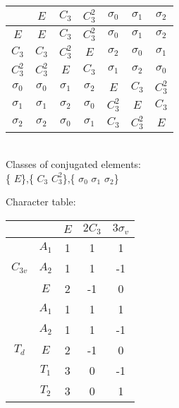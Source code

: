 \documentclass[12pt]{report}
\begin{document}
 
 
\newcommand{\rr}{\boldsymbol{r}} 
\newcommand{\kk}{\boldsymbol{k}} 
\newcommand{\RR}{\boldsymbol{R}} 
\newcommand{\fsp}{\mbox{ }} 
\renewcommand{\le}{\leqslant} 
\renewcommand{\ge}{\geqslant} 
\newcommand{\ds}{\displaystyle} 
\newcommand{\eps}{\varepsilon} 
\newcommand{\fmbr}{\begin{array}{c}} 
\newcommand{\fm}{\end{array}} 
\newcommand{\ra}{{\rightarrow}} 
\newcommand{\eq}{\begin{equation}} 
\newcommand{\eeq}{\end{equation}} 
\newcommand{\arsh}{\mathop{\rm arsh}\nolimits} 
 

\begin{tabular}{c | c c c c c c } 
& $E$& $C_3$& $C_3^2$& $\sigma_0$& $\sigma_1$& $\sigma_2$\\ 
 \hline 
 $E$& $E$& $C_3$& $C_3^2$& $\sigma_0$& $\sigma_1$& $\sigma_2$\\
$C_3$& $C_3$& $C_3^2$& $E$& $\sigma_2$& $\sigma_0$& $\sigma_1$\\
$C_3^2$& $C_3^2$& $E$& $C_3$& $\sigma_1$& $\sigma_2$& $\sigma_0$\\
$\sigma_0$& $\sigma_0$& $\sigma_1$& $\sigma_2$& $E$& $C_3$& $C_3^2$\\
$\sigma_1$& $\sigma_1$& $\sigma_2$& $\sigma_0$& $C_3^2$& $E$& $C_3$\\
$\sigma_2$& $\sigma_2$& $\sigma_0$& $\sigma_1$& $C_3$& $C_3^2$& $E$\\
\end{tabular}

\\
Classes of conjugated elements:
\\
\{ $E$\},\{ $C_3$ $C_3^2$\},\{ $\sigma_0$ $\sigma_1$ $\sigma_2$\}

Character table:


\begin{tabular}{c c | c c c } 
& & $E$& $2C_3$& $3\sigma_v$\\ 
 \hline 
& $A_1$& 1& 1& 1\\
$C_{3v}$& $A_2$& 1& 1& -1\\
& $E$& 2& -1& 0\\
\hline
&$A_1$& 1& 1& 1\\
&$A_2$& 1& 1& -1\\
$T_d$& $E$& 2& -1& 0\\
&$T_1$&3 &0 &-1 \\
&$T_2$&3 &0 &1 \\
\end{tabular}
\end{document}
